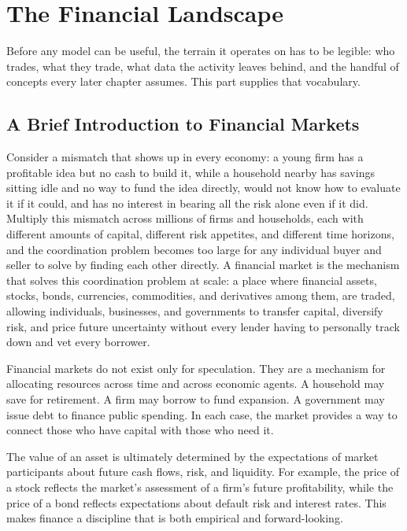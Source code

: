 \documentclass[../ai_in_finance]{subfiles}
\begin{document}
\section{The Financial Landscape}

Before any model can be useful, the terrain it operates on has to be legible: who trades, what they trade, what data the activity leaves behind, and the handful of concepts every later chapter assumes. This part supplies that vocabulary.

\subsection{A Brief Introduction to Financial Markets}

Consider a mismatch that shows up in every economy: a young firm has a profitable idea but no cash to build it, while a household nearby has savings sitting idle and no way to fund the idea directly, would not know how to evaluate it if it could, and has no interest in bearing all the risk alone even if it did. Multiply this mismatch across millions of firms and households, each with different amounts of capital, different risk appetites, and different time horizons, and the coordination problem becomes too large for any individual buyer and seller to solve by finding each other directly.
A financial market is the mechanism that solves this coordination problem at scale: a place where financial assets, stocks, bonds, currencies, commodities, and derivatives among them, are traded, allowing individuals, businesses, and governments to transfer capital, diversify risk, and price future uncertainty without every lender having to personally track down and vet every borrower.

Financial markets do not exist only for speculation. They are a mechanism for allocating resources across time and across economic agents. A household may save for retirement. A firm may borrow to fund expansion. A government may issue debt to finance public spending. In each case, the market provides a way to connect those who have capital with those who need it.

The value of an asset is ultimately determined by the expectations of market participants about future cash flows, risk, and liquidity. For example, the price of a stock reflects the market's assessment of a firm's future profitability, while the price of a bond reflects expectations about default risk and interest rates. This makes finance a discipline that is both empirical and forward-looking.
\end{document}
